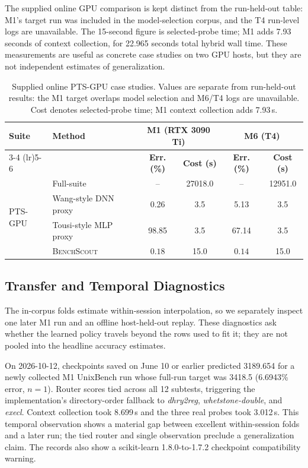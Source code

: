 \documentclass[sigconf, review, anonymous, balance=false]{acmart}
\newcommand{\ourmethod}{\textsc{BenchScout}\xspace}
\newcommand{\ptsgpu}{PTS-GPU}
\newcommand{\id}[1]{{\itshape #1}}
\begin{document}
The supplied online GPU comparison is kept distinct from the run-held-out table: M1's target run was included in the model-selection corpus, and the T4 run-level logs are unavailable. The 15-second figure is selected-probe time; M1 adds 7.93 seconds of context collection, for 22.965 seconds total hybrid wall time. These measurements are useful as concrete case studies on two GPU hosts, but they are not independent estimates of generalization.

\begin{table}[t]
\centering
\caption{Supplied online PTS-GPU case studies. Values are separate from run-held-out results: the M1 target overlaps model selection and M6/T4 logs are unavailable. Cost denotes selected-probe time; M1 context collection adds 7.93\,s.}
\label{tab:gpu-provenance}
\footnotesize
\setlength{\tabcolsep}{4.5pt}
\begin{tabular}{llcc|cc}
\toprule
\multirow{2}{*}{\textbf{Suite}} & \multirow{2}{*}{\textbf{Method}} & \multicolumn{2}{c|}{\textbf{M1 (RTX 3090 Ti)}} & \multicolumn{2}{c}{\textbf{M6 (T4)}} \\
\cmidrule(lr){3-4} \cmidrule(lr){5-6}
& & \textbf{Err. (\%)} & \textbf{Cost (s)} & \textbf{Err. (\%)} & \textbf{Cost (s)} \\
\midrule
\multirow{4}{*}{\ptsgpu}
& Full-suite & -- & 27018.0 & -- & 12951.0 \\
& Wang-style DNN proxy & 0.26 & 3.5 & 5.13 & 3.5 \\
& Tousi-style MLP proxy & 98.85 & 3.5 & 67.14 & 3.5 \\
& \ourmethod & $\mathbf{0.18}$ & 15.0 & $\mathbf{0.14}$ & 15.0 \\
\bottomrule
\end{tabular}
\end{table}

\subsection{Transfer and Temporal Diagnostics}
\label{subsec:transfer-diagnostics}
The in-corpus folds estimate within-session interpolation, so we separately inspect one later M1 run and an offline host-held-out replay. These diagnostics ask whether the learned policy travels beyond the rows used to fit it; they are not pooled into the headline accuracy estimates.

On 2026-10-12, checkpoints saved on June 10 or earlier predicted 3189.654 for a newly collected M1 UnixBench run whose full-run target was 3418.5 (6.6943\% error, $n=1$). Router scores tied across all 12 subtests, triggering the implementation's directory-order fallback to \id{dhry2reg}, \id{whetstone-double}, and \id{execl}. Context collection took 8.699\,s and the three real probes took 3.012\,s. This temporal observation shows a material gap between excellent within-session folds and a later run; the tied router and single observation preclude a generalization claim. The records also show a scikit-learn 1.8.0-to-1.7.2 checkpoint compatibility warning.
\end{document}

